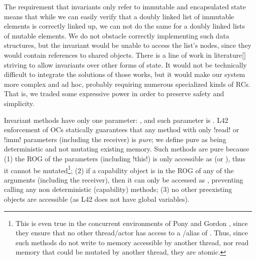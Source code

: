 The requirement that invariants only refer to immutable and encapsulated state means that while we can easily verify that a doubly linked list of immutable elements
is correctly linked up,
we can not do the same for a doubly linked lists of mutable elements. We do not obstacle correctly implementing such data structures, but the invariant would be unable to access the list's nodes, since they would contain \Q@mut@ references to shared objects.
There is a line of work in literature[] striving to allow invariants over other forms of state.
It would not be technically difficult to 
integrate the solutions of those works, but 
it would make our system more complex and ad hoc, probably requiring numerous specialized kinds of RCs.
That is, we traded some expressive power in order to preserve safety and simplicity.


\label{s:purity}
Invariant methods have only one parameter: \Q@this@, and such parameter is \Q@read@.
L42 enforcement of OCs statically guarantees that any method with only \Q!read! or \Q!imm! parameters (including the receiver) is \emph{pure}; we define pure
as being deterministic and not mutating existing memory. Such methods are pure because
(1) the ROG of the parameters (including \Q!this!) is only accessible as \Q@read@ (or \Q@imm@), thus it cannot be mutated\footnote{This is even true in the concurrent environments of Pony and Gordon \etal, since they ensure that no other thread/actor has access to a \Q@mut@/\Q@capsule@ alias of \Q@this@. 
	Thus, since such methods do not write to memory accessible by another thread, nor read memory that could be mutated by another thread, they are atomic.};
(2) if a capability object is in the ROG of any of the arguments (including the receiver), then it can only be accessed as \Q@read@, preventing calling any non deterministic (capability) methods;
(3) no other preexisting objects are accessible (as L42 does not have global variables). 



